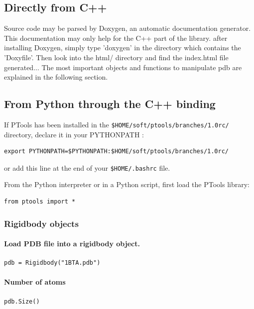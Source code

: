 \documentclass[12pt,a4paper]{article}
\begin{document}
\subsection{Directly from C++}

Source code may be parsed by Doxygen, an automatic documentation generator.
This documentation may only help for the C++ part of the library.
after installing Doxygen, simply type 'doxygen' in the directory which contains the 'Doxyfile'.
Then look into the html/ directory and find the index.html file generated...
The most important objects and functions to manipulate pdb are explained in the following section.

\subsection{From Python through the C++ binding}

If PTools has been installed in the {\tt \$HOME/soft/ptools/branches/1.0rc/} directory, 
declare it in your PYTHONPATH :

\begin{verbatim}
export PYTHONPATH=$PYTHONPATH:$HOME/soft/ptools/branches/1.0rc/
\end{verbatim}
or add this line at the end of your {\tt \$HOME/.bashrc} file.


From the Python interpreter or in a Python script, first load the PTools library:
\begin{verbatim}
from ptools import *
\end{verbatim}


\subsubsection{Rigidbody objects}

\paragraph{Load PDB file into a rigidbody object.}
\begin{verbatim}
pdb = Rigidbody("1BTA.pdb")
\end{verbatim}


\paragraph{Number of atoms}
\begin{verbatim}
pdb.Size()
\end{verbatim}
\end{document}
